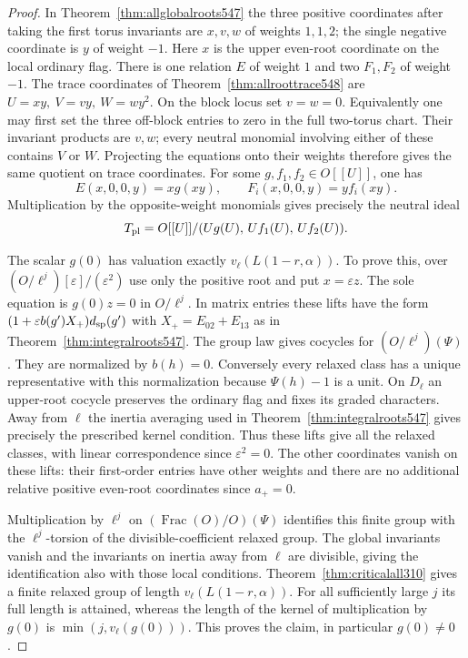 \documentclass[a4paper,11pt]{article}
\theoremstyle{definition}
\theoremstyle{remark}
\numberwithin{equation}{section}
\begin{document}
\begin{proof}
In Theorem~\ref{thm:allglobalroots547} the three positive
coordinates after taking the first torus invariants are
\(x,v,w\) of weights \(1,1,2\); the single negative coordinate
is \(y\) of weight \(-1\). Here \(x\) is the upper even-root
coordinate on the local ordinary flag. There is one relation
\(E\) of weight \(1\) and two \(F_1,F_2\) of weight \(-1\).
The trace coordinates of Theorem~\ref{thm:allroottrace548} are
\(U=xy,\ V=vy,\ W=wy^2\). On the block locus set \(v=w=0\).
Equivalently one may first set the three off-block entries
to zero in the full two-torus chart. Their invariant products
are \(v,w\); every neutral monomial involving either of these
contains \(V\) or \(W\). Projecting the equations onto their
weights therefore gives the same quotient on trace coordinates.
For some \(g,f_1,f_2\in O[[U]]\), one has
\[
 E(x,0,0,y)=xg(xy),\qquad F_i(x,0,0,y)=yf_i(xy).
\]
Multiplication by the opposite-weight monomials gives precisely
the neutral ideal
\[
               T_{\rm pl}=O[[U]]/(Ug(U),\,Uf_1(U),\,Uf_2(U)).
\]

The scalar \(g(0)\) has valuation exactly \(v_\ell(L(1-r,\alpha))\).
To prove this, over \((O/\ell^j)[\varepsilon]/(\varepsilon^2)\)
use only the positive root and put \(x=\varepsilon z\).
The sole equation is \(g(0)z=0\) in \(O/\ell^j\).
In matrix entries these lifts have the form
\((1+\varepsilon b(g')X_+)d_{\rm sp}(g')\) with
\(X_+=E_{02}+E_{13}\) as in Theorem~\ref{thm:integralroots547}.
The group law gives cocycles for \((O/\ell^j)(\Psi)\).
They are normalized by \(b(h)=0\). Conversely every relaxed
class has a unique representative with this normalization
because \(\Psi(h)-1\) is a unit. On \(D_\ell\) an upper-root
cocycle preserves the ordinary flag and fixes its graded
characters. Away from \(\ell\) the inertia averaging used in
Theorem~\ref{thm:integralroots547} gives precisely the prescribed
kernel condition. Thus these lifts give all the relaxed classes,
with linear correspondence since \(\varepsilon^2=0\). The
other coordinates vanish on these lifts: their first-order
entries have other weights and there are no additional
relative positive even-root coordinates since \(a_+=0\).

Multiplication by \(\ell^j\) on
\((\operatorname{Frac}(O)/O)(\Psi)\) identifies this finite
group with the \(\ell^j\)-torsion of the divisible-coefficient
relaxed group. The global invariants vanish and the invariants
on inertia away from \(\ell\) are divisible, giving the
identification also with those local conditions.
Theorem~\ref{thm:criticalall310} gives a finite relaxed group
of length \(v_\ell(L(1-r,\alpha))\). For all sufficiently
large \(j\) its full length is attained, whereas the
length of the kernel of multiplication by \(g(0)\) is
\(\min(j,v_\ell(g(0)))\). This proves the claim, in particular
\(g(0)\ne0\).


\end{proof}
\end{document}
